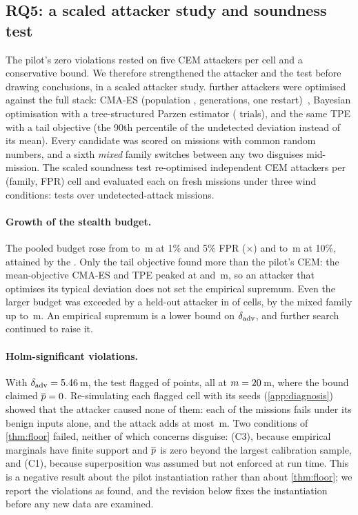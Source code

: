 \subsection{RQ5: a scaled attacker study and soundness test}
\label{sec:scaled}
The pilot's zero violations rested on five CEM attackers per cell and a
conservative bound. We therefore strengthened the attacker and the test before
drawing conclusions, in a scaled attacker study. \nROneAttackers{} further attackers were
optimised against the full stack: CMA-ES (population \nROneCmaPop,
\nROneCmaGens{} generations, one restart)~\cite{hansen2016cma}, Bayesian
optimisation with a tree-structured Parzen estimator (\nROneTrials{}
trials), and the same TPE with a tail objective (the 90th percentile of the
undetected deviation instead of its mean). Every candidate was scored on
\nROneK{} missions with common random numbers, and a sixth \emph{mixed} family
switches between any two disguises mid-mission. The scaled soundness test
re-optimised \nROneHeldSeeds{} independent CEM attackers per (family, FPR) cell
and evaluated each on \nROneEvalN{} fresh missions under three wind
conditions: \nROneTests{} tests over \nROneUndet{} undetected-attack missions.

\paragraph{Growth of the stealth budget.}
The pooled budget rose from \nDadvFive{} to \nROneDadvFive\,m at 1\% and 5\% FPR
(\nROneDadvRatioFive$\times$) and to \nROneDadvTen\,m at 10\%, attained by the
\nROneDadvArg. Only the tail objective found more than the pilot's CEM: the
mean-objective CMA-ES and TPE peaked at \nROneSupCma{} and \nROneSupTpe\,m, so an
attacker that optimises its typical deviation does not set the empirical
supremum. Even the larger budget was exceeded by a held-out attacker
in \nROneSupExceed{} of \nROneCells{} cells, by the mixed family up to
\nROneAdvMax\,m. An empirical supremum is a lower bound on $\delta_{\mathrm{adv}}$, and further
search continued to raise it.

\paragraph{Holm-significant violations.}
With $\delta_{\mathrm{adv}}=5.46$\,m, the test flagged \nROneViol{} of \nROneTests{}
points, all at $m=20$\,m, where the bound claimed $\overline{p}=0$. Re-simulating
each flagged cell with its seeds (\cref{app:diagnosis}) showed that the attacker
caused none of them: each of the \nDiagMissions{} missions fails under its benign
inputs alone, and the attack adds at most \nDiagAttackMax\,m. Two conditions of
\cref{thm:floor} failed, neither of which concerns disguise: (C3), because
empirical marginals have finite support and $\overline{p}$ is zero beyond the largest
calibration sample, and (C1), because superposition was assumed but not enforced
at run time. This is a negative result about the pilot instantiation rather than
about \cref{thm:floor}; we report the violations as found, and the revision below
fixes the instantiation before any new data are examined.

